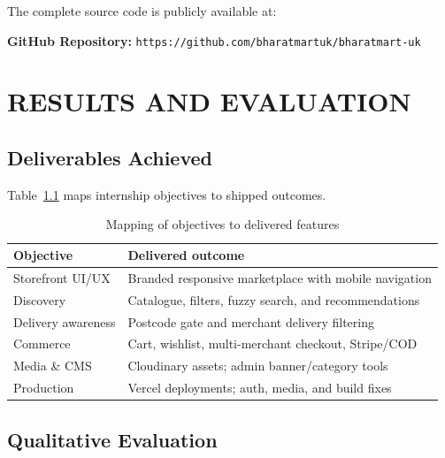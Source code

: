 \documentclass[12pt,a4paper]{report}
\begin{document}
The complete source code is publicly available at:

\vspace{0.2cm}
\begin{center}
{\small\textbf{GitHub Repository:}
\texttt{https://github.com/bharatmartuk/bharatmart-uk}}
\end{center}


\chapter{RESULTS AND EVALUATION}

\section{Deliverables Achieved}

Table~\ref{tab:deliverables} maps internship objectives to shipped outcomes.

\begin{table}[hbt!]
    \centering
    \renewcommand{\arraystretch}{1.45}
    \begin{tabular}{|p{4.2cm}|p{8.6cm}|}
        \hline
        \textbf{Objective} & \textbf{Delivered outcome} \\
        \hline
        Storefront UI/UX & Branded responsive marketplace with mobile navigation \\
        \hline
        Discovery & Catalogue, filters, fuzzy search, and recommendations \\
        \hline
        Delivery awareness & Postcode gate and merchant delivery filtering \\
        \hline
        Commerce & Cart, wishlist, multi-merchant checkout, Stripe/COD \\
        \hline
        Media \& CMS & Cloudinary assets; admin banner/category tools \\
        \hline
        Production & Vercel deployments; auth, media, and build fixes \\
        \hline
    \end{tabular}
    \vspace{0.2cm}
    \caption{Mapping of objectives to delivered features}
    \label{tab:deliverables}
\end{table}


\section{Qualitative Evaluation}
\end{document}
